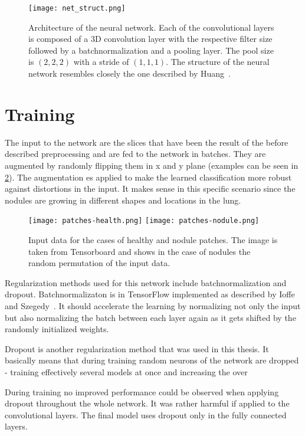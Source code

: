 \documentclass[main.tex]{subfiles}
\begin{document}
\begin{figure}
\begin{center}
\texttt{[image: net\_struct.png]}
\end{center}
\caption{Architecture of the neural network. Each of the convolutional layers is composed of a 3D convolution layer with the respective filter size followed by a batchnormalization and a pooling layer. The pool size is $(2,2,2)$ with a stride of $(1,1,1)$. The structure of the neural network resembles closely the one described by Huang~\cite{huang2017lung}.}
\label{fig:net_struct}
\end{figure}


\section{Training}
The input to the network are the slices that have been the result of the before described preprocessing and are fed to the network in batches. They are augmented by randomly flipping them in x and y plane (examples can be seen in \ref{fig:input}). The augmentation es applied to make the learned classification more robust against distortions in the input. It makes sense in this specific scenario since the nodules are growing in different shapes and locations in the lung.

\begin{figure}
\begin{center}
\texttt{[image: patches-health.png]}
\texttt{[image: patches-nodule.png]}
\end{center}
\caption{Input data for the cases of healthy and nodule patches. The image is taken from Tensorboard and shows in the case of nodules the random permutation of the input data.}
\label{fig:input}
\end{figure}

Regularization methods used for this network include batchnormalization and dropout. Batchnormalizaton is in TensorFlow implemented as described by Ioffe and Szegedy~\cite{ioffe2015batch}. It should accelerate the learning by normalizing not only the input but also normalizing the batch between each layer again as it gets shifted by the randomly initialized weights. 

Dropout is another regularization method that was used in this thesis. It basically means that during training random neurons of the network are dropped - training effectively several models at once \cite{srivastava2014dropout} and increasing the over


During training no improved performance could be observed when applying dropout throughout the whole network. It was rather harmful if applied to the convolutional layers. The final model uses dropout only in the fully connected  layers.
\end{document}
